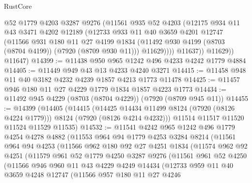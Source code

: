 \begin{lexlean}{RustCore}
\begin{coremodule}
              @52
              @1779
              @4203
              @3287
              @9276
              (@11561
                @935
                @52
                @4203
                (@12175
                  @934
                  @11
                  @43
                  @3471
                  @4202
                  @12189
                  (@12733
                    @933
                    @11
                    @40
                    @3659
                    @4201
                    @12747
                    (@11566
                      @931
                      @180
                      @11
                      @27
                      @4199
                      @1834
                      (@11492 @930 @4199 (@8703 (@8704 @4199)) (@7920 (@8709 @930 @11)))
                      @11629))))
              @11637))
          @11629))
      @11647)
@14399 := @11438 @950 @965 @1242 @496 @4233 @4242 @1779 @4884
@14405 := @11449 @949 @43 @13 @4233 @4240 @3271
@14415 := @11458 @948 @11 @40 @3182 @4232 @4239 @1857 @4213 @1773 @11478
@14425 := @11457 @946 @180 @11 @27 @4229 @1779 @1834 @1857 @4223 @1773
@14434 := @11492 @945 @4229 (@8703 (@8704 @4229)) (@7920 (@8709 @945 @11))
@14455 := @14399
    (@14405
      (@14415
        (@14425 @14434 @11499 @8124 (@7920 (@8126 @4224 @1779)))
        @8124
        (@7920 (@8126 @4214 @4232)))
      @11514
      @11517
      @11520
      @11524
      @11529
      @11535)
@14532 := @11541
    @4242
    @965
    @1242
    @496
    @1779
    @4254
    @4278
    @4882
    (@11553
      @964
      @94
      @1779
      @4253
      @3284
      @8214
      (@11561
        @964
        @94
        @4253
        (@11566
          @962
          @180
          @92
          @27
          @4251
          @1834
          (@11574
            @962
            @92
            @4251
            (@11579
              @961
              @52
              @1779
              @4250
              @3287
              @9276
              (@11561
                @961
                @52
                @4250
                (@11566
                  @946
                  @960
                  @11
                  @43
                  @4229
                  @4249
                  @14434
                  (@12733
                    @959
                    @11
                    @40
                    @3659
                    @4248
                    @12747
                    (@11566
                      @957
                      @180
                      @11
                      @27
                      @4246

\end{coremodule}
\end{lexlean}
